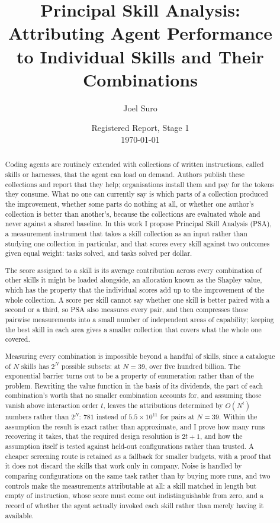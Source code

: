 \documentclass[11pt]{article}
\title{Principal Skill Analysis: Attributing Agent Performance\\to Individual Skills and Their Combinations}
\author{Joel Suro}
\date{Registered Report, Stage 1\\\today}
\theoremstyle{plain}
\theoremstyle{definition}
\theoremstyle{remark}
\begin{document}
\maketitle

\begin{abstract}
Coding agents are routinely extended with collections of written instructions, called skills or harnesses, that the agent can load on demand. Authors publish these collections and report that they help; organisations install them and pay for the tokens they consume. What no one can currently say is which parts of a collection produced the improvement, whether some parts do nothing at all, or whether one author's collection is better than another's, because the collections are evaluated whole and never against a shared baseline. In this work I propose Principal Skill Analysis (PSA), a measurement instrument that takes a skill collection as an input rather than studying one collection in particular, and that scores every skill against two outcomes given equal weight: tasks solved, and tasks solved per dollar.

The score assigned to a skill is its average contribution across every combination of other skills it might be loaded alongside, an allocation known as the Shapley value, which has the property that the individual scores add up to the improvement of the whole collection. A score per skill cannot say whether one skill is better paired with a second or a third, so PSA also measures every pair, and then compresses those pairwise measurements into a small number of independent areas of capability; keeping the best skill in each area gives a smaller collection that covers what the whole one covered.

Measuring every combination is impossible beyond a handful of skills, since a catalogue of $N$ skills has $2^N$ possible subsets: at $N = 39$, over five hundred billion. The exponential barrier turns out to be a property of enumeration rather than of the problem. Rewriting the value function in the basis of its dividends, the part of each combination's worth that no smaller combination accounts for, and assuming those vanish above interaction order $t$, leaves the attributions determined by $O(N^t)$ numbers rather than $2^N$: $781$ instead of $5.5 \times 10^{11}$ for pairs at $N = 39$. Within the assumption the result is exact rather than approximate, and I prove how many runs recovering it takes, that the required design resolution is $2t+1$, and how the assumption itself is tested against held-out configurations rather than trusted. A cheaper screening route is retained as a fallback for smaller budgets, with a proof that it does not discard the skills that work only in company. Noise is handled by comparing configurations on the same task rather than by buying more runs, and two controls make the measurements attributable at all: a skill matched in length but empty of instruction, whose score must come out indistinguishable from zero, and a record of whether the agent actually invoked each skill rather than merely having it available.


\end{abstract}
\end{document}
